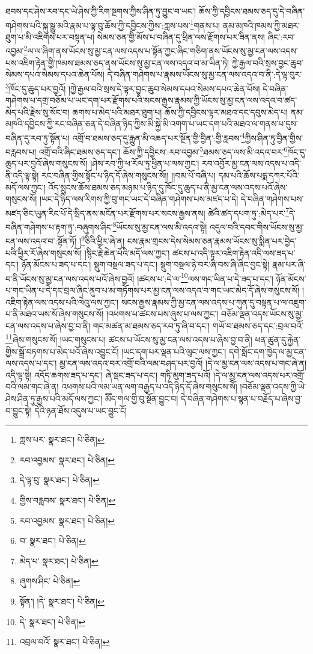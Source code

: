 ཐབས་དང་ཤེས་རབ་དང་ཡེ་ཤེས་ཀྱི་རིག་སྔགས་ཀྱིས་ཤིན་ཏུ་བྱུང་བ་ཡང་། ཆོས་ཀྱི་དབྱིངས་ཐམས་ཅད་དུ་དེ་བཞིན་གཤེགས་པའི་སྐུ་སྒྱུ་མའི་རྣམ་པ་ལྟ་བུ་ཆོས་ཀྱི་དབྱིངས་ཀྱིས་:ཀླས་པས་\footnote{ཀླས་པར་  སྣར་ཐང་།  པེ་ཅིན། }གནས་པ། ནམ་མཁའི་ཁམས་ཀྱི་མཐར་ཐུག་པ་མི་འཇིགས་པར་བསྟན་པ། སེམས་ཅན་གྱི་མོས་པ་བཞིན་དུ་ཕྲིན་ལས་རྫོགས་པར་ཟིན་ནས། ཞིང་:རབ་འབྱམ་\footnote{རབ་འབྱམས་  སྣར་ཐང་།  པེ་ཅིན། }ལ་ལ་ཞིག་ནས་ཡོངས་སུ་མྱ་ངན་ལས་འདས་པ་སྟོན་ཀྱང་ཞིང་གཅིག་ནས་ཡོངས་སུ་མྱ་ངན་ལས་འདས་པས་འཇིག་རྟེན་གྱི་ཁམས་ཐམས་ཅད་ནས་ཡོངས་སུ་མྱ་ངན་ལས་འདའ་བ་མ་ཡིན་ཏེ། ཀྱེ་རྒྱལ་བའི་སྲས་བྱང་ཆུབ་སེམས་དཔའ་སེམས་དཔའ་ཆེན་པོས། དེ་བཞིན་གཤེགས་པ་རྣམས་ཡོངས་སུ་མྱ་ངན་ལས་འདའ་བ་ནི་:དེ་ལྟ་བུར་\footnote{དེ་ལྟ་བུ་  སྣར་ཐང་།  པེ་ཅིན། }ཁོང་དུ་ཆུད་པར་བྱའོ། །ཀྱེ་རྒྱལ་བའི་སྲས་དེ་ལྟར་བྱང་ཆུབ་སེམས་དཔའ་སེམས་དཔའ་ཆེན་པོས། དེ་བཞིན་གཤེགས་པ་དགྲ་བཅོམ་པ་ཡང་དག་པར་རྫོགས་པའི་སངས་རྒྱས་རྣམས་ཀྱི་ཡོངས་སུ་མྱ་ངན་ལས་འདའ་བ་ཚད་མེད་པའི་རྗེས་སུ་སོང་བ། ཆགས་པ་མེད་པའི་མཐར་ཐུག་པ། ཆོས་ཀྱི་དབྱིངས་ལྟར་མཐའ་དང་དབུས་མེད་པ། ནམ་མཁའི་དབྱིངས་ཀྱི་རང་བཞིན་ཅན་དེ་བཞིན་ཉིད་ཀྱིས་མི་སྐྱེ་མི་འགག་པ་ཡང་དག་པའི་མཐའ་ལ་གནས་པ་དུས་བཞིན་དུ་རབ་ཏུ་སྟོན་པ། འགྲོ་བ་ཐམས་ཅད་དུ་རྒྱུན་མི་འཆད་པར་སྔོན་གྱི་བྱིན་:གྱི་རླབས་\footnote{གྱིས་བརླབས་  སྣར་ཐང་།  པེ་ཅིན། }ཀྱིས་ཤིན་ཏུ་བྱིན་གྱིས་བརླབས་པ། འགྲོ་བའི་ཞིང་ཐམས་ཅད་དང་། ཆོས་ཀྱི་དབྱིངས་:རབ་འབྱམ་\footnote{རབ་འབྱམས་  སྣར་ཐང་།  པེ་ཅིན། }ཐམས་ཅད་ལས་མི་འདའ་བར་\footnote{བ་  སྣར་ཐང་།  པེ་ཅིན། }ཁོང་དུ་ཆུད་པར་བྱའོ་ཞེས་གསུངས་སོ། །ཤེས་རབ་ཀྱི་ཕ་རོལ་ཏུ་ཕྱིན་པ་ལས་ཀྱང་། རབ་འབྱོར་མྱ་ངན་ལས་འདས་པ་འདི་ནི་འདི་ལྟ་སྟེ། རང་བཞིན་གྱིས་སྟོང་པ་ཉིད་དོ་ཞེས་གསུངས་སོ།། །།བམ་པོ་བཞི་པ། དམ་པའི་ཆོས་པདྨ་དཀར་པོའི་མདོ་ལས་ཀྱང་། འོད་སྲུངས་ཆོས་ཐམས་ཅད་མཉམ་པ་ཉིད་དུ་ཁོང་དུ་ཆུད་པ་ནི་མྱ་ངན་ལས་འདས་པའོ་ཞེས་གསུངས་སོ། །ཡང་དེ་ཉིད་ལས་རིགས་ཀྱི་བུ་གང་ཡང་དེ་བཞིན་གཤེགས་པས་མཛད་པ་དེ། དེ་བཞིན་གཤེགས་པས་མཛད་ཅིང་ཡུན་རིང་པོ་དེ་སྲིད་ནས་མངོན་པར་རྫོགས་པར་སངས་རྒྱས་ནས། ཚེའི་ཚད་དཔག་ཏུ་:མེད་པར་\footnote{མེད་པ་  སྣར་ཐང་།  པེ་ཅིན། }དེ་བཞིན་གཤེགས་པ་རྟག་ཏུ་:བཞུགས་ཤིང་\footnote{ཞུགས་ཤིང་  པེ་ཅིན། }ཡོངས་སུ་མྱ་ངན་ལས་མི་འདའ་སྟེ། འདུལ་བའི་དབང་གིས་ཡོངས་སུ་མྱ་ངན་ལས་འདའ་བ་:སྟོན་ཏོ། །\footnote{སྟོན་། །དེ་  སྣར་ཐང་།  པེ་ཅིན། }ཅིའི་ཕྱིར་ཞེ་ན། ངས་རྣམ་གྲངས་དེས་སེམས་ཅན་རྣམས་ཡོངས་སུ་སྨིན་པར་བྱེད་པའི་ཕྱིར་རོ་ཞེས་གསུངས་སོ། །སྙིང་རྗེ་ཆེན་པོའི་མདོ་ལས་ཀྱང་། ཚངས་པ་འདི་ལྟར་འཇིག་རྟེན་འདི་ལས་ཟད་པ་དང་། ཉོན་མོངས་པ་ཟད་པ་དང་། སྡུག་བསྔལ་ཟད་པ་དང་། སྡུག་བསྔལ་ཉེ་བར་ཞི་བས་ཞི་ཞིང་བྱང་སྟེ། རྣམ་པར་ཞི་བ་ནི་ཡོངས་སུ་མྱ་ངན་ལས་འདས་པའོ་ཞེས་བྱའོ། །ཚངས་པ་:དེ་ལ་\footnote{དེ་  སྣར་ཐང་།  པེ་ཅིན། }ལས་གང་ཡིན་པ་དེ་ཟད་པ་དང་། ཉོན་མོངས་པ་གང་ཡིན་པ་དེ་དང་བྲལ་ཞིང་ནུབ་པ་མ་གཏོགས་པར་མྱ་ངན་ལས་འདའ་བ་གང་ཡང་མེད་དོ་ཞེས་གསུངས་སོ། །འཇིག་རྟེན་ལས་འདས་པའི་ལེའུ་ལས་ཀྱང་། སངས་རྒྱས་རྣམས་ཀྱི་མྱ་ངན་ལས་འདས་པ་ཀུན་དུ་བསྟན་པ་ལ་འཇུག་པ་ནི་མཐའ་ཡས་སོ་ཞེས་གསུངས་སོ། །འཕགས་པ་ཚངས་པས་ཞུས་པ་ལས་ཀྱང་། བཅོམ་ལྡན་འདས་ཡོངས་སུ་མྱ་ངན་ལས་འདས་པ་ཞེས་བྱ་བ་ནི། གང་མཚན་མ་ཐམས་ཅད་རབ་ཏུ་ཞི་བ་དང་། གཡོ་བ་ཐམས་ཅད་དང་:བྲལ་བའོ་\footnote{འབྲལ་བའོ་  སྣར་ཐང་།  པེ་ཅིན། }ཞེས་གསུངས་སོ། །ཡང་གསུངས་པ། ཚངས་པ་ཡོངས་སུ་མྱ་ངན་ལས་འདས་པ་ཞེས་བྱ་བ་ནི། ཕན་ཚུན་དུ་རྐྱེན་གྱིས་སྒྲོ་བཏགས་པ་མེད་པའོ་ཞེས་འབྱུང་ངོ། །ཡང་དག་པར་ལྡན་པའི་ལུང་ལས་ཀྱང་། དགེ་སློང་དག་ཁྱེད་ལ་མྱ་ངན་ལས་འདས་པ་དང་། མྱ་ངན་ལས་འདའ་བར་འགྲོ་བའི་ལམ་བཤད་པར་བྱའོ། །དེ་ལ་མྱ་ངན་ལས་འདས་པ་གང་ཞེ་ན། འདི་ལྟ་སྟེ། འདོད་ཆགས་ཟད་པ་དང་། ཞེ་སྡང་ཟད་པ་དང་། གཏི་མུག་ཟད་པའོ། །དེ་ལ་མྱ་ངན་ལས་འདས་པར་འགྲོ་བའི་ལམ་གང་ཞེ་ན། འཕགས་པའི་ལམ་ཡན་ལག་བརྒྱད་པ་འདི་ཉིད་དོ་ཞེས་གསུངས་སོ། །བཅོམ་ལྡན་འདས་ཀྱི་ཡེ་ཤེས་ཤིན་ཏུ་རྒྱས་པའི་མདོ་ལས་ཀྱང་། མཽད་གལ་གྱི་བུ་སྔོན་བྱུང་བ། དེ་བཞིན་གཤེགས་པ་སྙན་པ་བརྗོད་པ་ཞེས་བྱ་བ་བྱུང་སྟེ། དེའི་ཉན་ཐོས་འདུས་པ་ཡང་བྱུང་ངོ། 